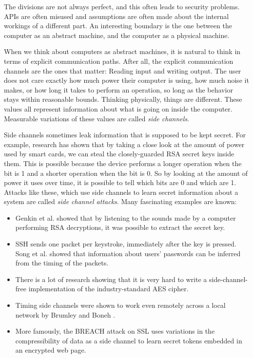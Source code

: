 \documentclass{acm_proc_article-sp}
\begin{document}
The divisions are not always perfect, and this often leads to security problems.
APIs are often misused and assumptions are often made about the internal
workings of a different part. An interesting boundary is the one between the
computer as an abstract machine, and the computer as a physical machine.

When we think about computers as abstract machines, it is natural to think in
terms of explicit communication paths. After all, the explicit communication
channels are the ones that matter: Reading input and writing output. The user
does not care exactly how much power their computer is using, how much noise it
makes, or how long it takes to perform an operation, so long as the behavior
stays within reasonable bounds. Thinking physically, things are different. These
values all represent information about what is going on inside the computer.
Measurable variations of these values are called \emph{side channels}.

Side channels sometimes leak information that is supposed to be kept secret. For
example, research \cite{messerges1999power} has shown that by taking a close
look at the amount of power used by smart cards, we can steal the
closely-guarded RSA secret keys inside them. This is possible because the device
performs a longer operation when the bit is 1 and a shorter operation when the
bit is 0. So by looking at the amount of power it uses over time, it is possible
to tell which bits are 0 and which are 1. Attacks like these, which use side
channels to learn secret information about a system are called \emph{side
channel attacks}. Many fascinating examples are known:

\begin{itemize}
\item Genkin et al. \cite{genkin2013rsa} showed that by listening to the sounds
made by a computer performing RSA decryptions, it was possible to extract the
secret key.

\item SSH sends one packet per keystroke, immediately after the key is pressed.
Song et al. \cite{song2001timing} showed that information about users' passwords
can be inferred from the timing of the packets.

\item There is a lot of research \cite{bernstein2005cache, osvik2006cache,
weiss2012cache, aciiccmez2006cache} showing that it is very hard to write
a side-channel-free implementation of the industry-standard AES cipher.

\item Timing side channels were shown to work even remotely across a local
network by Brumley and Boneh \cite{brumley2005remote}.

\item More famously, the BREACH attack on SSL \cite{gluck2013breach} uses
variations in the compressibility of data as a side channel to learn secret
tokens embedded in an encrypted web page.
\end{itemize}
\end{document}
